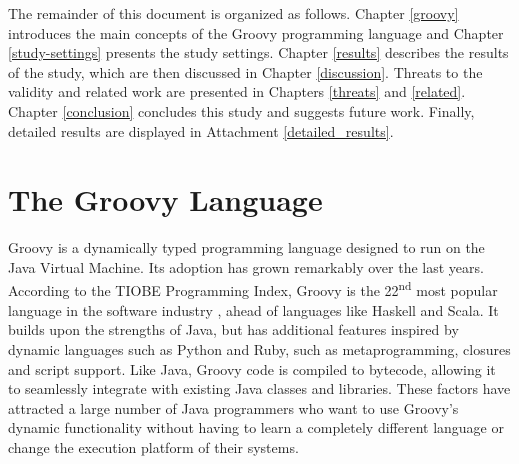 \documentclass[msc]{ppgccufmg}
\begin{document}

The remainder of this document is organized as follows. 
Chapter \ref{groovy} introduces the main concepts of the Groovy programming language and Chapter \ref{study-settings} presents the study settings.
Chapter \ref{results} describes the results of the study, which are then discussed in Chapter \ref{discussion}.
Threats to the validity and related work are presented in Chapters \ref{threats} and \ref{related}.
Chapter \ref{conclusion} concludes this study and suggests future work.
Finally, detailed results are displayed in Attachment \ref{detailed_results}.











%
%
\chapter{The Groovy Language\label{groovy}}
Groovy is a dynamically typed programming language designed to run on the Java Virtual Machine.
Its adoption has grown remarkably over the last years.
According to the TIOBE Programming Index, Groovy is the 22\textsuperscript{nd} most popular language in the software industry \cite{tiobe}, ahead of languages like Haskell and Scala. 
It builds upon the strengths of Java, but has additional features inspired by dynamic languages such as Python and Ruby, such as metaprogramming, closures and script support.
Like Java, Groovy code is compiled to bytecode, allowing it to seamlessly integrate with existing Java classes and libraries. 
These factors have attracted a large number of Java programmers who want to use Groovy's dynamic functionality without having to learn a completely different language or change the execution platform of their systems. 
\end{document}
